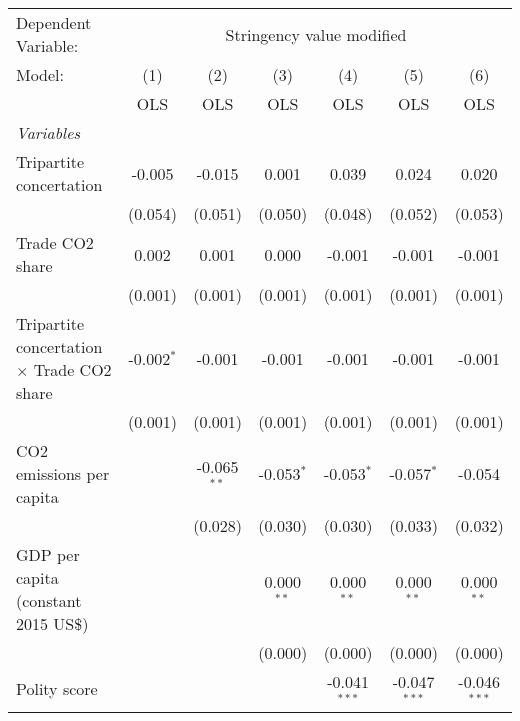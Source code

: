 
\begingroup
\centering
\begin{tabular}{lcccccc}
   \toprule
   Dependent Variable: & \multicolumn{6}{c}{Stringency value modified}\\
   Model:                                            & (1)          & (2)           & (3)          & (4)            & (5)            & (6)\\  
                                                     &  OLS         & OLS           & OLS          & OLS            & OLS            & OLS\\  
   \midrule
   \emph{Variables}\\
   Tripartite concertation                           & -0.005       & -0.015        & 0.001        & 0.039          & 0.024          & 0.020\\   
                                                     & (0.054)      & (0.051)       & (0.050)      & (0.048)        & (0.052)        & (0.053)\\   
   Trade CO2 share                                   & 0.002        & 0.001         & 0.000        & -0.001         & -0.001         & -0.001\\   
                                                     & (0.001)      & (0.001)       & (0.001)      & (0.001)        & (0.001)        & (0.001)\\   
   Tripartite concertation $\times$ Trade CO2 share  & -0.002$^{*}$ & -0.001        & -0.001       & -0.001         & -0.001         & -0.001\\   
                                                     & (0.001)      & (0.001)       & (0.001)      & (0.001)        & (0.001)        & (0.001)\\   
   CO2 emissions per capita                          &              & -0.065$^{**}$ & -0.053$^{*}$ & -0.053$^{*}$   & -0.057$^{*}$   & -0.054\\   
                                                     &              & (0.028)       & (0.030)      & (0.030)        & (0.033)        & (0.032)\\   
   GDP per capita (constant 2015 US\$)               &              &               & 0.000$^{**}$ & 0.000$^{**}$   & 0.000$^{**}$   & 0.000$^{**}$\\   
                                                     &              &               & (0.000)      & (0.000)        & (0.000)        & (0.000)\\   
   Polity score                                      &              &               &              & -0.041$^{***}$ & -0.047$^{***}$ & -0.046$^{***}$\\   

\end{tabular}
